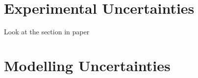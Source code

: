 \section{Experimental Uncertainties}
Look at the section in paper
\section{Modelling Uncertainties}


